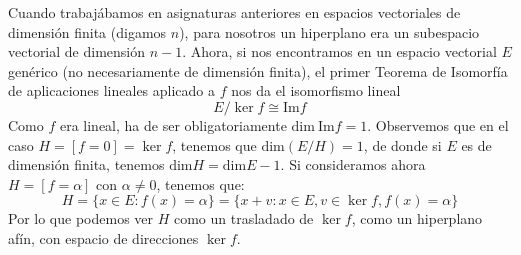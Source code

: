 \begin{observacion}
    Cuando trabajábamos en asignaturas anteriores en espacios vectoriales de dimensión finita (digamos $n$), para nosotros un hiperplano era un subespacio vectorial de dimensión $n-1$. Ahora, si nos encontramos en un espacio vectorial $E$ genérico (no necesariamente de dimensión finita), el primer Teorema de Isomorfía de aplicaciones lineales aplicado a $f$ nos da el isomorfismo lineal
    \begin{equation*}
        E/\ker f \cong \text{Im}f
    \end{equation*}
    Como $f$ era lineal, ha de ser obligatoriamente $\text{dim}\ \text{Im}f = 1$. Observemos que en el caso $H = [f=0] = \ker f$, tenemos que $\text{dim}(E/H) = 1$, de donde si $E$ es de dimensión finita, tenemos $\text{dim}H = \text{dim}E - 1$. Si consideramos ahora $H=[f=\alpha]$ con $\alpha\neq 0$, tenemos que:
    \begin{equation*}
        H = \{x\in E : f(x) = \alpha\} = \{x+v : x\in E, v\in \ker f, f(x) = \alpha\}
    \end{equation*}
    Por lo que podemos ver $H$ como un trasladado de $\ker f$, como un hiperplano afín, con espacio de direcciones $\ker f$.
\end{observacion}

